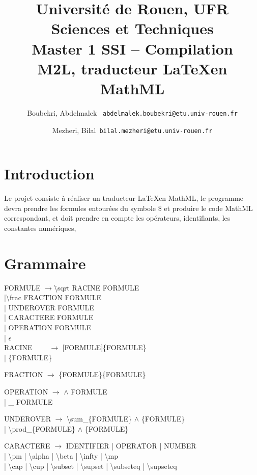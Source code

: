 \documentclass[12pt,a4paper]{article}
\author{
	Boubekri, Abdelmalek \     \texttt{abdelmalek.boubekri@etu.univ-rouen.fr}
	\and
	Mezheri, Bilal\   		   \texttt{bilal.mezheri@etu.univ-rouen.fr}
}
\title{	Université de Rouen, UFR Sciences et Techniques\\
		Master 1 SSI – Compilation\\
		M2L, traducteur \LaTeX en MathML\\ }
\begin{document}
	
	\maketitle
	\newpage

\section{Introduction}
Le projet consiste à réaliser un traducteur \LaTeX en MathML, le programme devra prendre les formules entourées du symbole \$ et produire le code MathML correspondant, et doit prendre en compte les opérateurs, identifiants, les constantes numériques, 

\section{Grammaire}
\begin{tabbing}
FORMULE 	$\rightarrow$\= \textbackslash sqrt RACINE FORMULE\\
	\>|\textbackslash frac FRACTION FORMULE\\
	\>| UNDEROVER FORMULE\\
	\>| CARACTERE FORMULE\\
	\>| OPERATION FORMULE\\
	\>| $\epsilon$ \\

RACINE	~~~~$\rightarrow$ [FORMULE]\{FORMULE\} \\
		\>| \{FORMULE\}\\

\linebreak

FRACTION	$\rightarrow$ \{FORMULE\}\{FORMULE\}\\

\linebreak

OPERATION	$\rightarrow$ $\wedge$ FORMULE\\
		\>| \_ FORMULE\\

\linebreak

UNDEROVER	$\rightarrow$ \textbackslash sum\_\{FORMULE\} $\wedge$ \{FORMULE\} \\
		\>| \textbackslash prod\_\{FORMULE\} $\wedge$ \{FORMULE\} \\

\linebreak

CARACTERE	$\rightarrow$ IDENTIFIER | OPERATOR | NUMBER\\
 \>| \textbackslash pm | \textbackslash alpha | \textbackslash beta | \textbackslash infty |  \textbackslash mp \\
 \>| \textbackslash cap | \textbackslash cup  | \textbackslash subset  | \textbackslash supset  | \textbackslash subseteq | \textbackslash supseteq

\end{tabbing}
\end{document}
